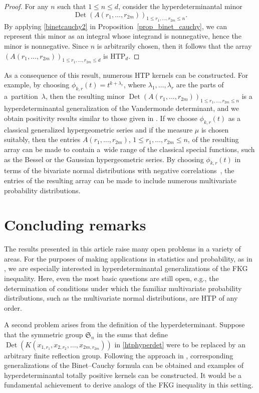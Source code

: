 \documentclass[10pt,a4paper]{amsart}
\numberwithin{equation}{section}
\def\Det{\operatorname{Det}}
\def\frS{\mathfrak{S}}
\begin{document}
\begin{proof}
For any $n$ such that $1 \le n \le d$, consider the hyperdeterminantal minor
\[
\Det(A(r_1,\dots,r_{2m}))_{1 \le r_1,\dots,r_{2m} \le n}.
\]
By applying \eqref{binetcauchy2} in Proposition~\ref{prop_binet_cauchy}, we can represent this minor as an integral whose integrand is nonnegative, hence the minor is nonnegative. Since $n$ is arbitrarily chosen, then it follows that the array $(A(r_1,\dots,r_{2m}))_{1 \le r_1,\dots,r_{2m} \le d}$ is HTP$_d$.
\end{proof}

As a consequence of this result, numerous HTP kernels can be constructed. For example, by choosing $\phi_{k,r}(t) = t^{k+\lambda_r}$, where $\lambda_1,\dots,\lambda_r$ are the parts of a~partition~$\lambda$, then the resulting minor $\Det(A(r_1,\dots,r_{2m}))_{1 \le r_1,\dots,r_{2m} \le n}$ is a hyperdeterminantal generalization of the Vandermonde determinant, and we obtain positivity results similar to those given in \cite{wanglixu}. If we choose $\phi_{k,r}(t)$ as a classical generalized hypergeometric series and if the measure $\mu$ is chosen suitably, then the entries $A(r_1,\dots,r_{2m})$, $1 \le r_1,\dots,r_{2m} \le n$, of the resulting array can be made to contain a~wide range of the classical special functions, such as the Bessel or the Gaussian hypergeometric series. By choosing $\phi_{k,r}(t)$ in terms of the bivariate normal distributions with negative correlations~\cite{karlinrinott80}, the entries of the resulting array can be made to include numerous multivariate probability distributions.


\section{Concluding remarks}
\label{sec_conclusions}

The results presented in this article raise many open problems in a variety of areas. For the purposes of making applications in statistics and probability, as in \cite{karlinrinott80}, we are especially interested in hyperdeterminantal generalizations of the FKG inequality. Here, even the most basic questions are still open, e.g., the determination of conditions under which the familiar multivariate probability distributions, such as the multivariate normal distributions, are HTP of any order.

A second problem arises from the definition of the hyperdeterminant. Suppose that the symmetric group $\frS_n$ in the sums that define $\Det(K(x_{1,r_1},x_{2,r_2},\dots,x_{2m,r_{2m}}))$ in \eqref{htphyperdet} were to be replaced by an arbitrary finite reflection group. Following the approach in \cite{grossrichards95}, corresponding generalizations of the Binet--Cauchy formula can be obtained and examples of hyperdeterminantal totally positive kernels can be constructed. It would be a fundamental achievement to derive analogs of the FKG inequality in this setting.
\end{document}
